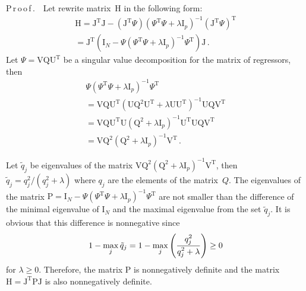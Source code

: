 \begin{multicols}{2}
\noindent
P\,r\,o\,o\,f\,.\ \ 
  Let rewrite matrix~H in the following form:
\begin{multline*}
   \mathrm{H} = \mathrm{J}^{\mathrm{T}}\mathrm{J}  - \left(\mathrm{J}^{\mathrm{T}} \Psi\right)
     \left( \Psi^{\mathrm{T}} \Psi + \lambda \mathrm{I}_p \right)^{-1} 
     \left( \mathrm{J}^{\mathrm{T}}  \Psi\right)^{\mathrm{T}}\\
      {}=
     \mathrm{J}^{\mathrm{T}}\left( \mathrm{I}_{N} - \Psi \left( \Psi^{\mathrm{T}} \Psi + 
     \lambda \mathrm{I}_p\right)^{-1} \Psi^{\mathrm{T}}  \right)\mathrm{J}\,.
  \end{multline*}
Let $\Psi = \mathrm{V} \mathrm{Q} \mathrm{U}^{\mathrm{T}}$ be a singular value 
decomposition for the matrix of regressors, then
\begin{multline*}
 \Psi \left( \Psi^{\mathrm{T}} \Psi + \lambda \mathrm{I}_p\right)^{-1} \Psi^{\mathrm{T}} \\
{}=  \mathrm{V} \mathrm{Q} \mathrm{U}^{\mathrm{T}} \left( \mathrm{U} 
\mathrm{Q}^2 \mathrm{U}^{\mathrm{T}} + \lambda \mathrm{U} \mathrm{U}^{\mathrm{T}}  
\right)^{-1} \mathrm{U} \mathrm{Q} \mathrm{V}^{\mathrm{T}} \\
{}   = \mathrm{V} \mathrm{Q} \mathrm{U}^{\mathrm{T}} 
\mathrm{U} \left( \mathrm{Q}^2  + \lambda \mathrm{I}_p  \right)^{-1} \mathrm{U}^{\mathrm{T}} 
\mathrm{U} \mathrm{Q} \mathrm{V}^{\mathrm{T}}\\
{} =
\mathrm{V} \mathrm{Q}^2 \left( \mathrm{Q}^2  + \lambda \mathrm{I}_p  
\right)^{-1} \mathrm{V}^{\mathrm{T}}\,.
\end{multline*}

Let $\tilde q_j$ be eigenvalues of the matrix $\mathrm{V} \mathrm{Q}^2 \left( \mathrm{Q}^2  + 
\lambda \mathrm{I}_p  \right)^{-1} \mathrm{V}^{\mathrm{T}}$, then
  $\tilde q_j = {q^2_j}/({q^2_j + \lambda})$ where $q_j$ are the elements of the matrix~$Q$.
The eigenvalues of the matrix $\mathrm{P} = \mathrm{I}_{N} - \Psi \left( 
\Psi^{\mathrm{T}} \Psi + \lambda \mathrm{I}_p\right)^{-1} \Psi^{\mathrm{T}}$ 
are not smaller than the difference of the minimal eigenvalue of
  $\mathrm{I}_{N}$ and the maximal eigenvalue from the set $\tilde q_j$.
  It is obvious that this difference is nonnegative since 
  $$
  1 - \max_j \tilde q_j =  1 - \max\limits_j \left( \displaystyle\frac{\displaystyle q^2_j\mathstrut}{\displaystyle {q^2_j + \lambda}\mathstrut}\right) 
  \ge 0
  $$ 
  for $\lambda \ge 0$.
  Therefore, the matrix $\mathrm{P}$ is nonnegatively definite and the matrix 
  $\mathrm{H} = \mathrm{J}^{\mathrm{T}} \mathrm{P} \mathrm{J}$ is also 
  nonnegatively definite.



\end{multicols}
